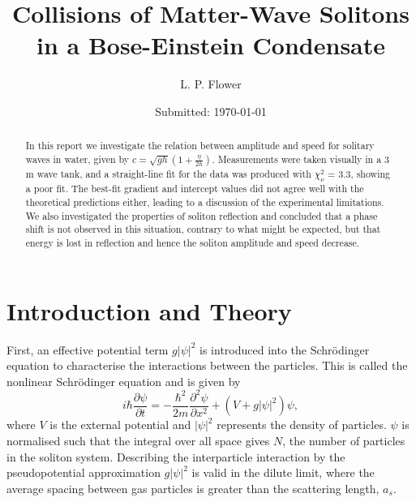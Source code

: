 \documentclass[10pt, twocolumn]{revtex4}    %
\begin{document}
                     


\title{Collisions of Matter-Wave Solitons in a Bose-Einstein Condensate} 
\date{Submitted: \today{}}
\author{L. P. Flower}

\begin{abstract}              
 
In this report we investigate the relation between amplitude and speed for solitary waves in water, given by $c = \sqrt{gh} \left(1 + \frac{\eta}{2h} \right)$. Measurements were taken visually in a 3 m wave tank, and a straight-line fit for the data was produced with $\chi_\nu^2$ = 3.3, showing a poor fit. The best-fit gradient and intercept values did not agree well with the theoretical predictions either, leading to a discussion of the experimental limitations. We also investigated the properties of soliton reflection and concluded that a phase shift is not observed in this situation, contrary to what might be expected, but that energy is lost in reflection and hence the soliton amplitude and speed decrease. 

\end{abstract}

\maketitle
\thispagestyle{plain} %



\section{Introduction and Theory} \label{Intro}

First, an effective potential term $g |\psi|^2$  is introduced into the Schr\"{o}dinger equation to characterise the interactions between the particles. This is called the nonlinear Schr\"{o}dinger equation and is given by 
\begin{equation} \label{NLSE}
i \hbar \frac{\partial \psi}{\partial t} = -\frac{\hbar^2}{2m} \frac{\partial^2 \psi}{\partial x^2} + (V+g |\psi|^2) \psi,
\end{equation}
where $V$ is the external potential and $|\psi|^2$ represents the density of particles. $\psi$ is normalised such that the integral over all space gives $N$, the number of particles in the soliton system. Describing the interparticle interaction by the pseudopotential approximation $g |\psi|^2$ is valid in the dilute limit, where the average spacing between gas particles is greater than the scattering length, $a_s$. 
\end{document}
